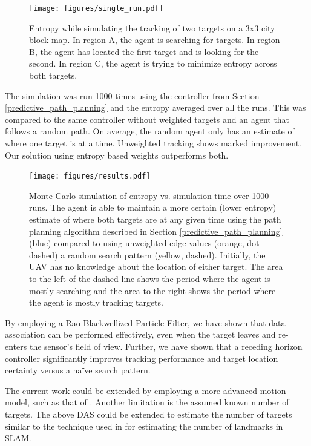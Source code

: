 \documentclass[letterpaper, 10 pt, conference]{ieeeconf}  %
\begin{document}
\begin{figure}
\texttt{[image: figures/single\_run.pdf]}
\caption{Entropy while simulating the tracking of two targets on a 3x3 city block map. In region A, the agent is searching for targets. In region B, the agent has located the first target and is looking for the second. In region C, the agent is trying to minimize entropy across both targets.}
\label{fig:single_run}
\end{figure}

The simulation was run 1000 times using the controller from Section \ref{predictive_path_planning} and the entropy averaged over all the runs. This was compared to the same controller without weighted targets and an agent that follows a random path. On average, the random agent only has an estimate of where one target is at a time. Unweighted tracking shows marked improvement. Our solution using entropy based weights outperforms both.

\begin{figure}
\texttt{[image: figures/results.pdf]}
\caption{Monte Carlo simulation of entropy vs. simulation time over 1000 runs. The agent is able to maintain a more certain (lower entropy) estimate of where both targets are at any given time using the path planning algorithm described in Section \ref{predictive_path_planning} (blue) compared to using unweighted edge values (orange, dot-dashed) a random search pattern (yellow, dashed). Initially, the UAV has no knowledge about the location of either target. The area to the left of the dashed line shows the period where the agent is mostly searching and the area to the right shows the period where the agent is mostly tracking targets.}
\label{fig:results}
\end{figure}


By employing a Rao-Blackwellized Particle Filter, we have shown that data association can be performed effectively, even when the target leaves and re-enters the sensor's field of view. Further, we have shown that a receding horizon controller significantly improves tracking performance and target location certainty versus a na\"{i}ve search pattern.

The current work could be extended by employing a more advanced motion model, such as that of \cite{Cheng2007}. Another limitation is the assumed known number of targets. The above DAS could be extended to estimate the number of targets similar to the technique used in \cite{Thrun2006} for estimating the number of landmarks in SLAM.
\end{document}
